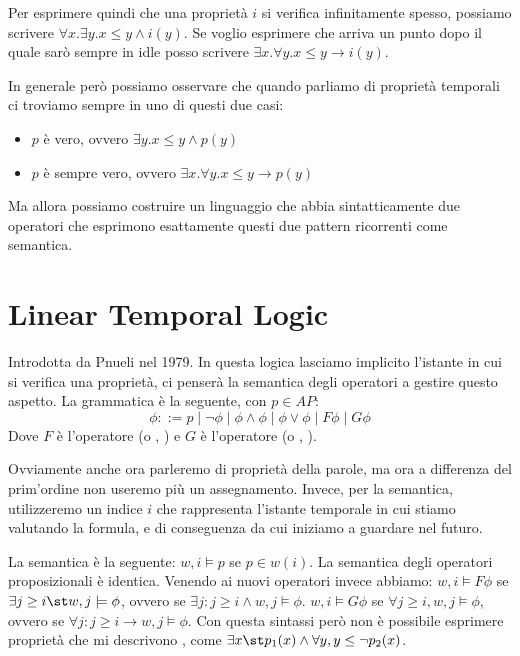 Per esprimere quindi che una proprietà \(i\) si verifica infinitamente spesso, possiamo scrivere \(\forall x. \exists y. x \leq y \land i(y)\).
Se voglio esprimere che arriva un punto dopo il quale sarò sempre in idle posso scrivere \(\exists x. \forall y. x \leq y \to i(y)\).

In generale però possiamo osservare che quando parliamo di proprietà temporali ci troviamo sempre in uno di questi due casi:
\begin{itemize}
  \item {} \(p\) è vero, ovvero \(\exists y. x \leq y \land p(y)\)
  \item {} \(p\) è sempre vero, ovvero \(\exists x. \forall y. x \leq y \to p(y)\)
\end{itemize}

Ma allora possiamo costruire un linguaggio che abbia sintatticamente due operatori che esprimono esattamente questi due pattern ricorrenti come semantica.

\section{Linear Temporal Logic}

Introdotta da Pnueli nel 1979. In questa logica lasciamo implicito l'istante in cui si verifica una proprietà, ci penserà la semantica degli operatori a gestire questo aspetto.
La grammatica è la seguente, con \(p \in AP\):
\[\phi ::= p \mid \neg \phi \mid \phi \land \phi \mid \phi \lor \phi \mid F\phi \mid G\phi\]
Dove \(F\) è l'operatore  (o , ) e \(G\) è l'operatore  (o , ).

Ovviamente anche ora parleremo di proprietà della parole, ma ora a differenza del prim'ordine non useremo più un assegnamento. Invece, per la semantica, utilizzeremo un indice \(i\) che rappresenta l'istante temporale in cui stiamo valutando la formula, e di conseguenza da cui iniziamo a guardare nel futuro.

La semantica è la seguente:
\(w,i \models p\) se \(p \in w(i)\).
La semantica degli operatori proposizionali è identica.
Venendo ai nuovi operatori invece abbiamo:
\(w,i\models F\phi\) se \(\exists j \geq i \st w, j \models \phi\), ovvero se \(\exists j: j \geq i \land w,j\models\phi\).
\(w,i\models G\phi\) se \(\forall j \geq i , w, j \models \phi\), ovvero se \(\forall j: j \geq i \to w,j\models\phi\).
Con questa sintassi però non è possibile esprimere proprietà che mi descrivono , come \(\exists x \st p_1(x) \land \forall y, y\leq \neg p_2(x)\).

